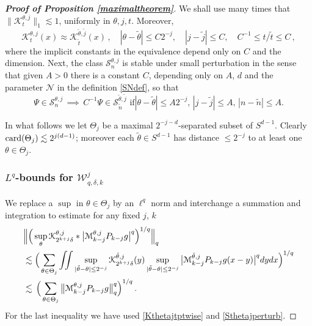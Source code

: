 \documentclass[11pt]{amsart}
\theoremstyle{definition}
\numberwithin{theorem}{section}
\numberwithin{definition}{section}
\newcommand{\Be}{\begin{equation}}
\newcommand{\Ee}{\end{equation}}
\newcommand{\note}[1]{\footnote{\texttt{\Small #1}}}
\def\card{\text{\rm card}}
\def\lc{\lesssim}
\def\cK{{\mathcal {K}}}
\def\cM{{\mathcal {M}}}
\def\cN{{\mathcal {N}}}
\def\cS{{\mathcal {S}}}
\def\cW{{\mathcal {W}}}
\begin{document}
\begin{proof}[\bf Proof of Proposition \ref {maximaltheorem}]
 We  shall use many times that
$\|\cK^{\theta,j}_t\|_1\lc 1$, uniformly in $\theta, j,t$. Moreover,
\Be\label{Kthetajtptwise}
\cK^{\theta,j}_t(x) \approx \cK^{\tilde \theta, \tilde j}_{\tilde t}(x)\,,
\quad |\theta-\tilde \theta|\le C 2^{-j}, \quad |j-\tilde j|\le C,
 \quad C^{-1}\le
 t/\tilde t \le C\,,
\Ee
where the implicit constants in the equivalence depend only on  $C$ and the dimension.
Next, the class $\cS^{\theta,j}_n$ is stable under
small perturbation in the sense that given $A>0$
there is a  constant $C$,   depending only on $A$, $d$ and
 the parameter $\cN$ in the definition \eqref{SNdef},
so that
\Be\label{Sthetajperturb}
\Psi\in \cS^{\theta,j}_n \,\implies \,
C^{-1}\Psi\in \cS^{\tilde \theta,\tilde j}_{\tilde n} \text{ if
$|\theta- \tilde \theta|\le A 2^{-j}$, $|j-\tilde j|\le A$,  $|n-\tilde n|\le A$.}
\Ee

In what follows we let $\Theta_j$ be a maximal $2^{-j-d} $-separated subset
 of $S^{d-1}$.
Clearly $\card(\Theta_j)\lc 2^{j(d-1)}$; moreover each $\tilde \theta\in S^{d-1}$ has distance $\le 2^{-j}$ to at least one $\theta\in \Theta_j$.


\subsubsection*{$L^q$-bounds for  $\cW_{q,\delta,k}^j$}
We replace a $\sup$ in $\theta\in \Theta_j$ by an $\ell^q$ norm and
interchange a summation and integration to
 estimate for any fixed $j$, $k$
\begin{align}
&\Big\|\Big( \sup_{\theta} \cK^{\theta,j}_{2^{k+j}\delta}
*\big|\cM^{\theta,j}_{k-j}
P_{k-j} g\big|^q
\Big)^{1/q}\Big\|_q
\notag
\\
&\lc\Big( \sum_{\theta\in \Theta_j}\iint
\sup_{|\tilde \theta-\theta|\le 2^{-j} }
\cK^{\tilde \theta,j}_{2^{k+j}\delta}(y)
\sup_{|\tilde \theta-\theta|\le 2^{-j} }\big|\cM^{\tilde\theta,j}_{k-j}
P_{k-j} g(x-y)\big|^q dy dx\Big)^{1/q}
\notag
\\
&\lc\,
\Big( \sum_{\theta\in \Theta_j}\big\|
\cM^{\theta,j}_{k-j}
P_{k-j} g\big\|_q^q\Big)^{1/q}\, .
\notag
\end{align}
For the last inequality we have used
\eqref{Kthetajtptwise} and \eqref{Sthetajperturb}.


\end{proof}
\end{document}
